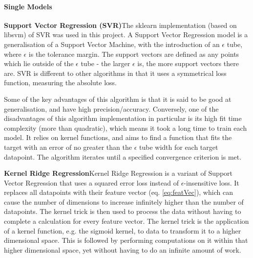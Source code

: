 \documentclass[11pt, titlepage]{article}
\begin{document}
\paragraph*{Single Models}
\begin{description}
	\item \textbf{Support Vector Regression (SVR)}\quad The sklearn implementation (based on libsvm\cite{libsvm}) of SVR\cite{SupportVectorRegression} was used in this project. A Support Vector Regression model is a generalisation of a Support Vector Machine, with the introduction of an $\epsilon$ tube, where $\epsilon$ is the tolerance margin. The support vectors are defined as any points which lie outside of the $\epsilon$ tube - the larger $\epsilon$ is, the more support vectors there are. SVR is different to other algorithms in that it uses a symmetrical loss function, measuring the absolute loss\cite{Awad2015}.
	
	Some of the key advantages of this algorithm is that it is said to be good at generalisation, and have high precision/accuracy. Conversely, one of the disadvantages of this algorithm implementation in particular is its high fit time complexity (more than quadratic), which means it took a long time to train each model. It relies on kernel functions, and aims to find a function that fits the target with an error of no greater than the  $\epsilon$ tube width for each target datapoint. The algorithm iterates until a specified convergence criterion is met\cite{SVR_MathWorks}. 
	\item \textbf{Kernel Ridge Regression}\quad Kernel Ridge Regression is a variant of Support Vector Regression that uses a squared error loss instead of $\epsilon$-insensitive loss\cite{KRR_Scikit}. It replaces all datapoints with their feature vector (eq. \ref{eq:featVec}), which can cause the number of dimensions to increase infinitely higher than the number of datapoints\cite{KRR_Welling}. The kernel trick is then used to process the data without having to complete a calculation for every feature vector\cite{KRR_Haugh}. The kernel trick is the application of a kernel function, e.g. the sigmoid kernel, to data to transform it to a higher dimensional space\cite{IBM_SVM}. This is followed by performing computations on it within that higher dimensional space, yet without having to do an infinite amount of work.


\end{description}
\end{document}
